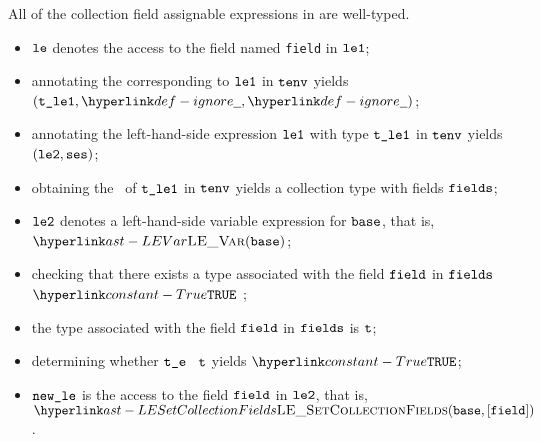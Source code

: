 

All of the collection field assignable expressions in
 are well-typed.

\ProseParagraph
\AllApply
\begin{itemize}
  \item $\texttt{le}$ denotes the access to the field named \texttt{field} in
    $\texttt{le1}$;
  \item annotating the \rhsexpression{} corresponding to $\texttt{le1}$
    in $\texttt{tenv}$ yields \\ $(\vtleone, \Ignore, \Ignore)$\ProseOrTypeError;
  \item annotating the left-hand-side expression  $\texttt{le1}$ with type
    $\texttt{t\_le1}$ in $\texttt{tenv}$ yields \\ $(\texttt{le2}, \texttt{ses})$\ProseOrTypeError;
  \item obtaining the \underlyingtypeterm\ of $\texttt{t\_le1}$ in $\texttt{tenv}$ yields a
    collection type with fields $\texttt{fields}$\ProseOrTypeError;
  \item $\texttt{le2}$ denotes a left-hand-side variable expression for $\texttt{base}$,
    that is, $\LEVar(\vbase)$;
  \item checking that there exists a type associated with the field $\texttt{field}$
    in $\texttt{fields}$ $\True$ \ProseTerminateAs{\BadField};
  \item the type associated with the field $\texttt{field}$ in $\texttt{fields}$ is $\texttt{t}$;
  \item determining whether $\texttt{t\_e}$ \typesatisfiesterm\ $\texttt{t}$ yields
    $\True$\ProseOrTypeError;
  \item $\texttt{new\_le}$ is the access to the field $\texttt{field}$ in $\texttt{le2}$, that is,
    $\LESetCollectionFields(\vbase, [\vfield])$.
\end{itemize}

